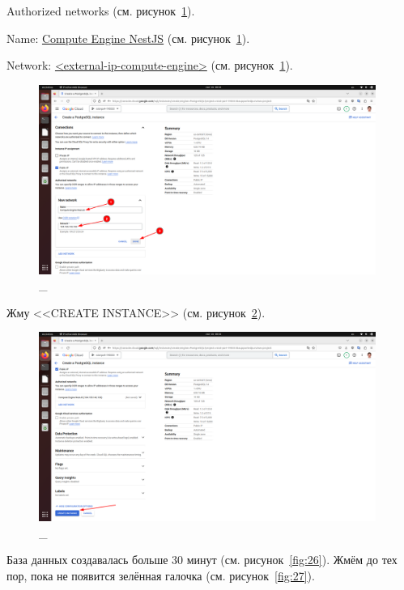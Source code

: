 \documentclass[12pt, a4paper, simple]{eskdtext}
\begin{document}
  Authorized networks (см. рисунок~\ref{fig:24}).

  Name: \underline{Compute Engine NestJS} (см. рисунок~\ref{fig:24}).

  Network: \underline{<external-ip-compute-engine>} (см. рисунок~\ref{fig:24}).

  \begin{figure}[!h]
    \centering
    \includegraphics[width=11cm]
    {images/2023-02-26_00-03-30.png}
    \caption{\_}
    \label{fig:24}
  \end{figure}

  Жму <<CREATE INSTANCE>> (см. рисунок~\ref{fig:25}).

  \begin{figure}[!h]
    \centering
    \includegraphics[width=11cm]
    {images/2023-02-26_00-03-55.png}
    \caption{\_}
    \label{fig:25}
  \end{figure}

  База данных создавалась больше 30 минут (см. рисунок~\ref{fig:26}). Жмём до тех пор, пока не появится зелённая галочка (см. рисунок~\ref{fig:27}).
\end{document}
